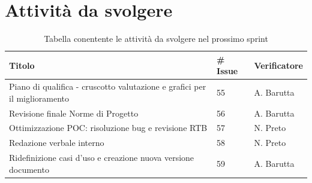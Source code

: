\documentclass{article}
\begin{document}
\section{Attività da svolgere}
    \begin{table}[H]
        \centering
        \begin{tabular}{|C{7cm}|C{1,5cm}|C{3cm}|}
            \hline
            \textbf{Titolo} & \textbf{\# Issue} & \textbf{Verificatore} \\
            \hline\hline           
            Piano di qualifica - cruscotto valutazione e grafici per il miglioramento  & 55 & A. Barutta \\
            \hline
            Revisione finale Norme di Progetto & 56 & A. Barutta \\
            \hline
            Ottimizzazione POC: risoluzione bug e revisione RTB & 57 & N. Preto \\
            \hline
            Redazione verbale interno & 58 & N. Preto \\
            \hline
            Ridefinizione casi d'uso e creazione nuova versione documento & 59 & A. Barutta \\
            \hline
        \end{tabular}
        \caption{Tabella conentente le attività da svolgere nel prossimo sprint}
    \end{table}
\end{document}
